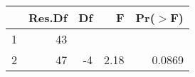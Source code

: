 \begin{table}[ht]
\centering
\begin{tabular}{lrrrr}
  \hline
 & Res.Df & Df & F & Pr($>$F) \\ 
  \hline
1 & 43 &  &  &  \\ 
  2 & 47 & -4 & 2.18 & 0.0869 \\ 
   \hline
\end{tabular}
\end{table}
